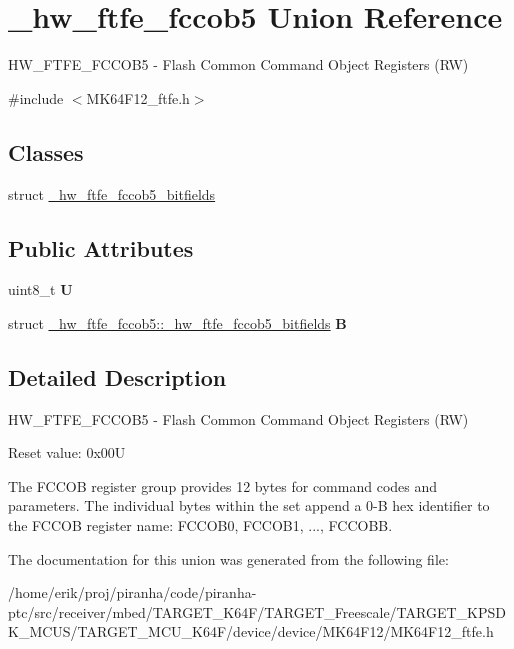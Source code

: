 \hypertarget{union__hw__ftfe__fccob5}{}\section{\+\_\+hw\+\_\+ftfe\+\_\+fccob5 Union Reference}
\label{union__hw__ftfe__fccob5}


H\+W\+\_\+\+F\+T\+F\+E\+\_\+\+F\+C\+C\+O\+B5 -\/ Flash Common Command Object Registers (RW)  




{\ttfamily \#include $<$M\+K64\+F12\+\_\+ftfe.\+h$>$}

\subsection*{Classes}
\begin{DoxyCompactItemize}
\item 
struct \hyperlink{struct__hw__ftfe__fccob5_1_1__hw__ftfe__fccob5__bitfields}{\+\_\+hw\+\_\+ftfe\+\_\+fccob5\+\_\+bitfields}
\end{DoxyCompactItemize}
\subsection*{Public Attributes}
\begin{DoxyCompactItemize}
\item 
uint8\+\_\+t {\bfseries U}\hypertarget{union__hw__ftfe__fccob5_af613380ae697ea0d89959bf42b6ae292}{}\label{union__hw__ftfe__fccob5_af613380ae697ea0d89959bf42b6ae292}

\item 
struct \hyperlink{struct__hw__ftfe__fccob5_1_1__hw__ftfe__fccob5__bitfields}{\+\_\+hw\+\_\+ftfe\+\_\+fccob5\+::\+\_\+hw\+\_\+ftfe\+\_\+fccob5\+\_\+bitfields} {\bfseries B}\hypertarget{union__hw__ftfe__fccob5_aba5a435d8eabb93a6be21bdfc16ffa6d}{}\label{union__hw__ftfe__fccob5_aba5a435d8eabb93a6be21bdfc16ffa6d}

\end{DoxyCompactItemize}


\subsection{Detailed Description}
H\+W\+\_\+\+F\+T\+F\+E\+\_\+\+F\+C\+C\+O\+B5 -\/ Flash Common Command Object Registers (RW) 

Reset value\+: 0x00U

The F\+C\+C\+OB register group provides 12 bytes for command codes and parameters. The individual bytes within the set append a 0-\/B hex identifier to the F\+C\+C\+OB register name\+: F\+C\+C\+O\+B0, F\+C\+C\+O\+B1, ..., F\+C\+C\+O\+BB. 

The documentation for this union was generated from the following file\+:\begin{DoxyCompactItemize}
\item 
/home/erik/proj/piranha/code/piranha-\/ptc/src/receiver/mbed/\+T\+A\+R\+G\+E\+T\+\_\+\+K64\+F/\+T\+A\+R\+G\+E\+T\+\_\+\+Freescale/\+T\+A\+R\+G\+E\+T\+\_\+\+K\+P\+S\+D\+K\+\_\+\+M\+C\+U\+S/\+T\+A\+R\+G\+E\+T\+\_\+\+M\+C\+U\+\_\+\+K64\+F/device/device/\+M\+K64\+F12/M\+K64\+F12\+\_\+ftfe.\+h\end{DoxyCompactItemize}
